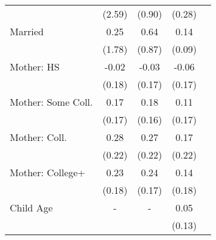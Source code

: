 \begin{tabular}{lcccc}
&(2.59)&(0.90)&(0.28)&\\
Married&0.25&0.64&0.14&\\&(1.78)&(0.87)&(0.09)&\\Mother: HS&-0.02&-0.03&-0.06&\\&(0.18)&(0.17)&(0.17)&\\Mother: Some Coll.&0.17&0.18&0.11&\\&(0.17)&(0.16)&(0.17)&\\Mother: Coll.&0.28&0.27&0.17&\\&(0.22)&(0.22)&(0.22)&\\Mother: College+&0.23&0.24&0.14&\\&(0.18)&(0.17)&(0.18)&\\Child Age&-&-&0.05&\\&&&(0.13)&\\\bottomrule\end{tabular}